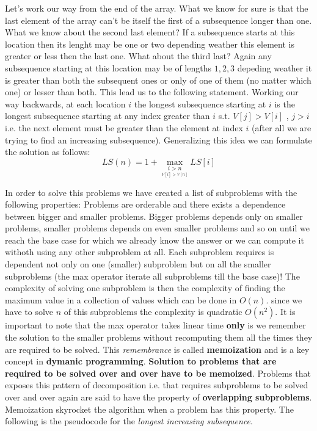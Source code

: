 Let's work our way from the end of the array. What we know for sure is that the last element of the array can't be itself the first of a subsequence longer than one.
What we know about the second last element?
If a subsequence starts at this location then its lenght may be one or two depending weather this element is greater or less then the last one.
What about the third last? Again any subsequence starting at this location may be of lengths $1,2,3$ depeding weather it is greater than both the subsequent ones or only of one of them (no matter which one) or lesser than both.
This lead us to the following statement. Working our way backwards, at each location $i$ the longest subsequence starting at $i$ is the longest subsequence starting at any index greater than $i$ s.t. $V[j] > V[i]$ , $j>i$ i.e. the next element must be greater than the element at index $i$ (after all we are trying to find an increasing subsequence). 
Generalizing this idea we can formulate the solution as follows:
\[
LS(n) = 1+ \underset{ \underset{ V[i] > V[n]}{i > n} }{\max}{ LS[i]}
\]
 
In order to solve this problems we have created a list of subproblems with the following properties:
Problems are orderable and there exists a dependence between bigger and smaller problems. Bigger problems depends only on smaller problems, smaller problems depends on even smaller problems and so on until we reach the base case for which we already know the answer or we can compute it withoth using any other subproblem at all.
Each subproblem requires is dependent not only on one (smaller) subproblem but on all the smaller subproblems (the max operator iterate all subproblems till the base case)!
The complexity of solving one subproblem is then the complexity of finding the maximum value in a collection of values which can be done in $O(n)$. since we have to solve $n$ of this subproblems the complexity is quadratic $O(n^2)$. It is important to note that the max operator takes linear time \textbf{only} is we remember the solution to the smaller problems without recomputing them all the times they are required to be solved. This \textit{remembrance} is called \textbf{memoization} and is a key concept in \textbf{dymanic programming}. \textbf{Solution to problems that are required to be solved over and over have to be memoized}. 
Problems that exposes this pattern of decomposition i.e. that requires subproblems to be solved over and over again are said to have the property of \textbf{overlapping subproblems}. Memoization skyrocket the algorithm when a problem has this property.
The following is the pseudocode for the \textit{longest increasing subsequence}.


